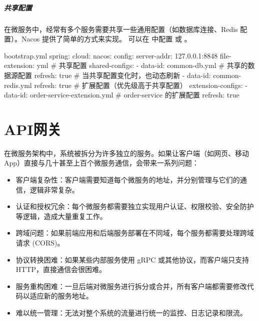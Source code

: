 \subparagraph{共享配置}
在微服务中，经常有多个服务需要共享一些通用配置（如数据库连接、Redis 配置）。Nacos 提供了简单的方式来实现。
可以在  中配置  或 。
\begin{codeblock}[yml]{bootstrap.yml}
spring:
  cloud:
    nacos:
      config:
        server-addr: 127.0.0.1:8848
        file-extension: yml
        # 共享配置
        shared-configs:
          - data-id: common-db.yml # 共享的数据源配置
            refresh: true # 当共享配置变化时，也动态刷新
          - data-id: common-redis.yml
            refresh: true
        # 扩展配置（优先级高于共享配置）
        extension-configs:
          - data-id: order-service-extension.yml # order-service 的扩展配置
            refresh: true
\end{codeblock}


\section{API网关}
在微服务架构中，系统被拆分为许多独立的服务。如果让客户端（如网页、移动 App）直接与几十甚至上百个微服务通信，会带来一系列问题：

\begin{itemize}
    \item 客户端复杂性：客户端需要知道每个微服务的地址，并分别管理与它们的通信，逻辑非常复杂。 
    \item 认证和授权冗余：每个微服务都需要独立实现用户认证、权限校验、安全防护等逻辑，造成大量重复工作。
    \item 跨域问题：如果前端应用和后端服务部署在不同域，每个服务都需要处理跨域请求 (CORS)。
    \item 协议转换困难：如果某些内部服务使用 gRPC 或其他协议，而客户端只支持 HTTP，直接通信会很困难。
    \item 服务重构困难：一旦后端对微服务进行拆分或合并，所有客户端都需要修改代码以适应新的服务地址。
    \item 难以统一管理：无法对整个系统的流量进行统一的监控、日志记录和限流。
\end{itemize}


